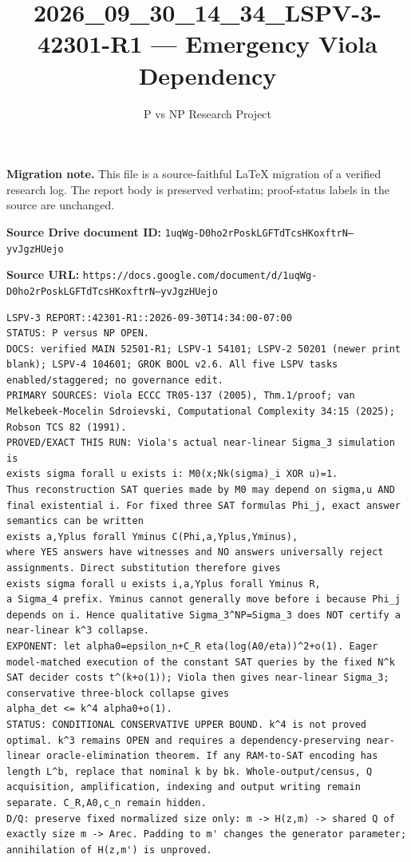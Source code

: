 \documentclass[11pt]{article}
\title{2026\_09\_30\_14\_34\_LSPV-3-42301-R1 — Emergency Viola Dependency}
\author{P vs NP Research Project}
\date{}
\begin{document}
\maketitle

\noindent\textbf{Migration note.} This file is a source-faithful LaTeX migration of a verified research log. The report body is preserved verbatim; proof-status labels in the source are unchanged.

\noindent\textbf{Source Drive document ID:} \texttt{1uqWg-D0ho2rPoskLGFTdTcsHKoxftrN--yvJgzHUejo}

\noindent\textbf{Source URL:} \texttt{https://docs.google.com/document/d/1uqWg-D0ho2rPoskLGFTdTcsHKoxftrN--yvJgzHUejo}

\bigskip
\begin{Verbatim}[breaklines=true,breakanywhere=true]
LSPV-3 REPORT::42301-R1::2026-09-30T14:34:00-07:00
STATUS: P versus NP OPEN.
DOCS: verified MAIN 52501-R1; LSPV-1 54101; LSPV-2 50201 (newer print blank); LSPV-4 104601; GROK BOOL v2.6. All five LSPV tasks enabled/staggered; no governance edit.
PRIMARY SOURCES: Viola ECCC TR05-137 (2005), Thm.1/proof; van Melkebeek-Mocelin Sdroievski, Computational Complexity 34:15 (2025); Robson TCS 82 (1991).
PROVED/EXACT THIS RUN: Viola's actual near-linear Sigma_3 simulation is
exists sigma forall u exists i: M0(x;Nk(sigma)_i XOR u)=1.
Thus reconstruction SAT queries made by M0 may depend on sigma,u AND final existential i. For fixed three SAT formulas Phi_j, exact answer semantics can be written
exists a,Yplus forall Yminus C(Phi,a,Yplus,Yminus),
where YES answers have witnesses and NO answers universally reject assignments. Direct substitution therefore gives
exists sigma forall u exists i,a,Yplus forall Yminus R,
a Sigma_4 prefix. Yminus cannot generally move before i because Phi_j depends on i. Hence qualitative Sigma_3^NP=Sigma_3 does NOT certify a near-linear k^3 collapse.
EXPONENT: let alpha0=epsilon_n+C_R eta(log(A0/eta))^2+o(1). Eager model-matched execution of the constant SAT queries by the fixed N^k SAT decider costs t^(k+o(1)); Viola then gives near-linear Sigma_3; conservative three-block collapse gives
alpha_det <= k^4 alpha0+o(1).
STATUS: CONDITIONAL CONSERVATIVE UPPER BOUND. k^4 is not proved optimal. k^3 remains OPEN and requires a dependency-preserving near-linear oracle-elimination theorem. If any RAM-to-SAT encoding has length L^b, replace that nominal k by bk. Whole-output/census, Q acquisition, amplification, indexing and output writing remain separate. C_R,A0,c_n remain hidden.
D/Q: preserve fixed normalized size only: m -> H(z,m) -> shared Q of exactly size m -> Arec. Padding to m' changes the generator parameter; annihilation of H(z,m') is unproved.

\end{Verbatim}
\end{document}

